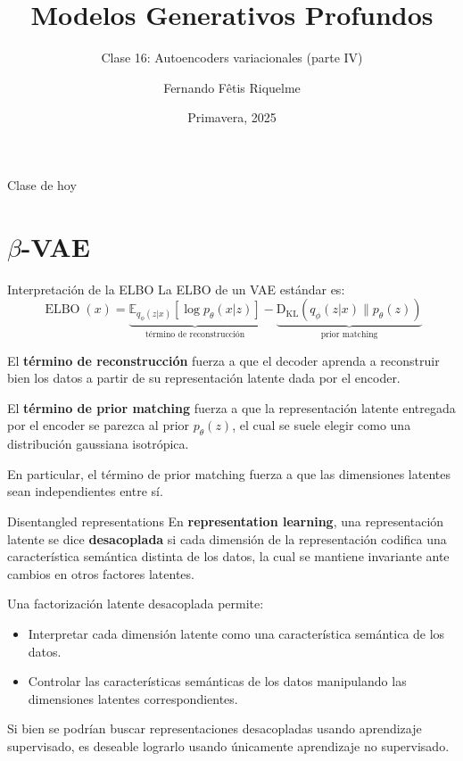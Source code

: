 \documentclass{beamer}
\title{Modelos Generativos Profundos}
\subtitle{Clase 16: Autoencoders variacionales (parte IV)}
\author{Fernando Fêtis Riquelme}
\institute{
    Facultad de Ciencias Físicas y Matemáticas\\
    Universidad de Chile
}
\date{Primavera, 2025}
\begin{document}
\begin{frame}
    \titlepage
\end{frame}

\begin{frame}{Clase de hoy}
    \tableofcontents
\end{frame}

\section{$\beta$-VAE}

\begin{frame}{Interpretación de la ELBO}
    La ELBO de un VAE estándar es:
    \begin{equation*}
        \operatorname{ELBO}(x) = \underbrace{\mathbb{E}_{q_\phi(z|x)}\left[\log p_\theta(x|z)\right]}_{\text{término de reconstrucción}} - \underbrace{\operatorname{{D}_{KL}}\left(q_\phi(z|x)\| p_\theta(z)\right)}_{\text{prior matching}}
    \end{equation*}

    El \textbf{término de reconstrucción} fuerza a que el decoder aprenda a reconstruir bien los datos a partir de su representación latente dada por el encoder.

    El \textbf{término de prior matching} fuerza a que la representación latente entregada por el encoder se parezca al prior $p_\theta(z)$, el cual se suele elegir como una distribución gaussiana isotrópica.
    
    En particular, el término de prior matching fuerza a que las dimensiones latentes sean independientes entre sí.
\end{frame}

\begin{frame}{Disentangled representations}
    En \textbf{representation learning}, una representación latente se dice \textbf{desacoplada} si cada dimensión de la representación codifica una característica semántica distinta de los datos, la cual se mantiene invariante ante cambios en otros factores latentes.
    
    Una factorización latente desacoplada permite:
    \begin{itemize}
        \item Interpretar cada dimensión latente como una característica semántica de los datos.
        \item Controlar las características semánticas de los datos manipulando las dimensiones latentes correspondientes.
    \end{itemize}
    Si bien se podrían buscar representaciones desacopladas usando aprendizaje supervisado, es deseable lograrlo usando únicamente aprendizaje no supervisado.
\end{frame}
\end{document}

